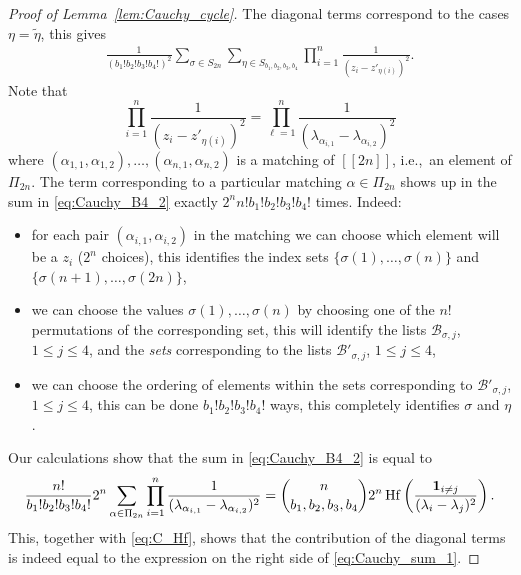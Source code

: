 \documentclass[pdftex]{sigma}
\numberwithin{equation}{section}
\theoremstyle{definition}
\newcommand{\ind}{{\bf{1}}}
\newcommand{\cB}{\mathcal{B}}
\newcommand{\Hf}{\operatorname{Hf}}
\newcommand{\lst}[1]{[\![#1 ]\!]}
\begin{document}
\begin{proof}[Proof of Lemma~\ref{lem:Cauchy_cycle}]
The diagonal terms correspond to the cases $\eta=\tilde \eta$, this gives
\begin{align}\label{eq:Cauchy_B4_2}
 \frac{1}{(b_1! b_2! b_3! b_4!)^2}\sum_{\sigma\in S_{2n}} \sum_{\eta \in S_{b_1,b_2,b_3,b_4}} \prod_{i=1}^n \frac{1}{(z_i-z'_{\eta(i)})^2}.
\end{align}
Note that
\[
\prod_{i=1}^n \frac{1}{(z_i-z'_{\eta(i)})^2}=\prod_{\ell=1}^n \frac{1}{(\lambda_{\alpha_{i,1}}-\lambda_{\alpha_{i,2}})^2}
\]
where $(\alpha_{1,1},\alpha_{1,2}), \dots, (\alpha_{n,1},\alpha_{n,2})$ is a matching of $\lst{2n}$, i.e.,~an element of $\Pi_{2n}$. The term corresponding to a particular matching $\alpha\in \Pi_{2n}$ shows up in the sum in \eqref{eq:Cauchy_B4_2} exactly $2^n n! b_1! b_2! b_3! b_4!$ times. Indeed:
\begin{itemize}\itemsep=0pt
\item[--] for each pair $(\alpha_{i,1},\alpha_{i,2})$ in the matching we can choose which element will be a $z_i$ ($2^n$ choices), this identifies the index sets $\{\sigma(1),\dots,\sigma(n)\}$ and $\{\sigma(n+1),\dots,\sigma(2n)\}$,
\item[--] we can choose the values $\sigma(1), \dots, \sigma(n)$ by choosing one of the $n!$ permutations of the corresponding set, this will identify the lists $\cB_{\sigma,j}$, $1\le j\le 4$, and the \emph{sets} corresponding to the lists $\cB'_{\sigma,j}$, $1\le j\le 4$,
\item[--] we can choose the ordering of elements within the sets corresponding to $\cB'_{\sigma,j}$, $1\le j\le 4$, this can be done $b_1!b_2!b_3!b_4!$ ways, this completely identifies $\sigma$ and $\eta$.
\end{itemize}

Our calculations show that the sum in \eqref{eq:Cauchy_B4_2} is equal to
\[
\frac{n!}{b_1!b_2!b_3!b_4!} 2^n \sum_{\alpha\in \Pi_{2n}} \prod_{i=1}^n \frac{1}{(\lambda_{\alpha_{i,1}}-\lambda_{\alpha_{i,2}})^2}=\binom{n}{b_1,b_2,b_3,b_4} 2^n \Hf\left(\frac{\ind_{i\neq j}}{(\lambda_i-\lambda_j)^2}\right).
\]
This, together with \eqref{eq:C_Hf}, shows that the contribution of the diagonal terms is indeed equal to the expression on the right side of \eqref{eq:Cauchy_sum_1}.


\end{proof}
\end{document}
